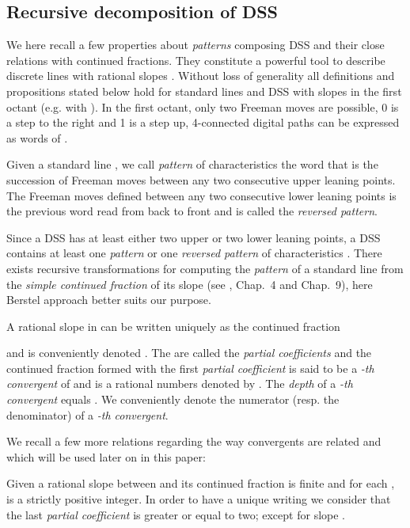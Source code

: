 \documentclass{llncs}
\begin{document}
\subsection{Recursive decomposition of DSS}
We here recall a few properties about \emph{patterns} composing DSS
and their close relations with continued fractions. They constitute a
powerful tool to describe discrete lines with rational slopes
\cite{Berstel97,HarWri60}.  Without loss of generality all definitions
and propositions stated below hold for standard lines and DSS with
slopes in the first octant (e.g.  with ). In the first octant, only two Freeman moves are possible, 0 is a
step to the right and 1 is a step up, 4-connected digital paths can be
expressed as words of .
\begin{definition}
  Given a standard line , we call \emph{pattern} of
  characteristics  the word that is the succession of Freeman
  moves between any two consecutive upper leaning points. The Freeman
  moves defined between any two consecutive lower leaning points is
  the previous word read from back to front and is called the
  \emph{reversed pattern}.
\end{definition}
Since a DSS has at least either two upper or two lower leaning points,
a DSS  contains at least one \emph{pattern} or one
\emph{reversed pattern} of characteristics . There exists
recursive transformations for computing the \emph{pattern} of a
standard line from the \emph{simple continued fraction} of its slope
(see \cite{Berstel97}, \cite{Voss93} Chap.~4 and \cite{Klette04}
Chap.~9), here Berstel approach better suits our purpose.

A rational slope  in  can be written uniquely as the
continued fraction

and is conveniently denoted .  The
 are called the \emph{partial coefficients} and the continued
fraction formed with the  first \emph{partial coefficient} is
said to be a \emph{-th convergent} of  and is a rational numbers
denoted by .  The \emph{depth} of a \emph{-th convergent}
equals . We conveniently denote  the numerator (resp.
 the denominator) of a \emph{-th convergent}.

We recall a few more relations regarding the way convergents are related and
which will be used later on in this paper:

Given a rational slope between  and  its continued fraction is
finite and for each ,  is a strictly positive integer. In
order to have a unique writing we consider that the last \emph{partial
  coefficient} is greater or equal to two; except for slope .
\end{document}
